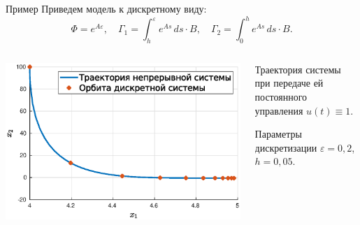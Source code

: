         \begin{frame}{Пример}
                Приведем модель к дискретному виду:
                $$
                        \Phi = e^{A\varepsilon},
                        \quad
                        \Gamma_1 = \int_{h}^{\varepsilon} e^{As}\,ds \cdot B,
                        \quad
                        \Gamma_2 = \int_{0}^{h} e^{As}\,ds \cdot B.
                $$
                \begin{columns}
                        \begin{column}{0.5\textwidth}
                                \includegraphics[width=1.15\textwidth]{content/discrete-example/cont-and-disc.eps}
                        \end{column}
                        \begin{column}{0.5\textwidth}
                                Траектория системы при передаче ей постоянного управления $u(t) \equiv 1$. 

                                \vspace{0.8cm}

                                Параметры дискретизации $\varepsilon = 0,\!2$, $h = 0,\!05$.
                        \end{column}
                \end{columns}
        \end{frame}
